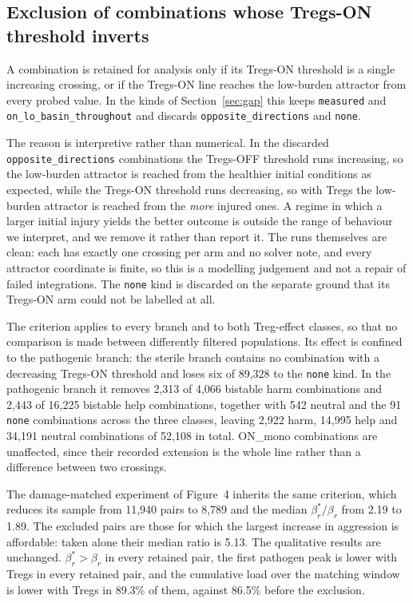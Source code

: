 \documentclass[11pt]{article}
\begin{document}
\subsection{Exclusion of combinations whose Tregs-ON threshold inverts}
\label{sec:excl_decreasing}

A combination is retained for analysis only if its Tregs-ON threshold is a single
increasing crossing, or if the Tregs-ON line reaches the low-burden attractor from every
probed value. In the kinds of Section~\ref{sec:gap} this keeps \texttt{measured} and
\texttt{on\_lo\_basin\_throughout} and discards \texttt{opposite\_directions} and
\texttt{none}.

The reason is interpretive rather than numerical. In the discarded
\texttt{opposite\_directions} combinations the Tregs-OFF threshold runs increasing, so the
low-burden attractor is reached from the healthier initial conditions as expected, while
the Tregs-ON threshold runs decreasing, so with Tregs the low-burden attractor is reached
from the \emph{more} injured ones. A regime in which a larger initial injury yields the
better outcome is outside the range of behaviour we interpret, and we remove it rather
than report it. The runs themselves are clean: each has exactly one crossing per arm and
no solver note, and every attractor coordinate is finite, so this is a modelling
judgement and not a repair of failed integrations. The \texttt{none} kind is discarded on
the separate ground that its Tregs-ON arm could not be labelled at all.

The criterion applies to every branch and to both Treg-effect classes, so that no
comparison is made between differently filtered populations. Its effect is confined to
the pathogenic branch: the sterile branch contains no combination with a decreasing
Tregs-ON threshold and loses six of 89,328 to the \texttt{none} kind. In the pathogenic
branch it removes 2,313 of 4,066 bistable harm combinations and 2,443 of 16,225 bistable
help combinations, together with 542 neutral and the 91 \texttt{none} combinations across
the three classes, leaving 2,922 harm, 14,995 help and 34,191 neutral combinations of
52,108 in total. ON\_mono combinations are unaffected, since their recorded extension is
the whole line rather than a difference between two crossings.

The damage-matched experiment of Figure~4 inherits the same criterion, which reduces its
sample from 11,940 pairs to 8,789 and the median $\beta_r^{*}/\beta_r$ from 2.19 to 1.89.
The excluded pairs are those for which the largest increase in aggression is affordable:
taken alone their median ratio is 5.13. The qualitative results are unchanged.
$\beta_r^{*} > \beta_r$ in every retained pair, the first pathogen peak is lower with
Tregs in every retained pair, and the cumulative load over the matching window is lower
with Tregs in 89.3\% of them, against 86.5\% before the exclusion.
\end{document}
